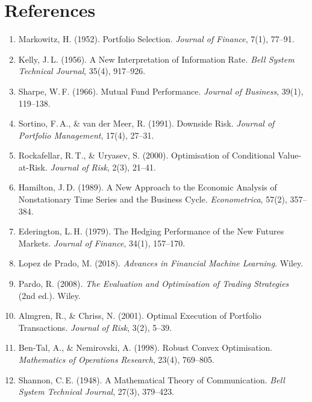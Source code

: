 \documentclass[12pt,openany]{book}
\numberwithin{equation}{chapter}
\theoremstyle{plain}
\theoremstyle{definition}
\theoremstyle{remark}
\begin{document}
\chapter*{References}

\begin{enumerate}
    \item Markowitz, H. (1952). Portfolio Selection. \textit{Journal of Finance}, 7(1), 77--91.
    \item Kelly, J.\,L. (1956). A New Interpretation of Information Rate.
          \textit{Bell System Technical Journal}, 35(4), 917--926.
    \item Sharpe, W.\,F. (1966). Mutual Fund Performance.
          \textit{Journal of Business}, 39(1), 119--138.
    \item Sortino, F.\,A., \& van der Meer, R. (1991). Downside Risk.
          \textit{Journal of Portfolio Management}, 17(4), 27--31.
    \item Rockafellar, R.\,T., \& Uryasev, S. (2000). Optimisation of
          Conditional Value-at-Risk. \textit{Journal of Risk}, 2(3), 21--41.
    \item Hamilton, J.\,D. (1989). A New Approach to the Economic Analysis
          of Nonstationary Time Series and the Business Cycle.
          \textit{Econometrica}, 57(2), 357--384.
    \item Ederington, L.\,H. (1979). The Hedging Performance of the New
          Futures Markets. \textit{Journal of Finance}, 34(1), 157--170.
    \item Lopez de Prado, M. (2018). \textit{Advances in Financial Machine Learning}.
          Wiley.
    \item Pardo, R. (2008). \textit{The Evaluation and Optimisation of Trading
          Strategies} (2nd ed.). Wiley.
    \item Almgren, R., \& Chriss, N. (2001). Optimal Execution of Portfolio
          Transactions. \textit{Journal of Risk}, 3(2), 5--39.
    \item Ben-Tal, A., \& Nemirovski, A. (1998). Robust Convex Optimisation.
          \textit{Mathematics of Operations Research}, 23(4), 769--805.
    \item Shannon, C.\,E. (1948). A Mathematical Theory of Communication.
          \textit{Bell System Technical Journal}, 27(3), 379--423.
\end{enumerate}
\end{document}
